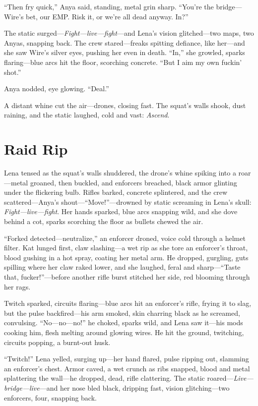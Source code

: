 \documentclass[12pt]{book}
\begin{document}
``Then fry quick,'' Anya said, standing, metal grin sharp. ``You’re the bridge---Wire’s bet, our EMP. Risk it, or we’re all dead anyway. In?''

The static surged---\emph{Fight---live---fight}---and Lena’s vision glitched---two maps, two Anyas, snapping back. The crew stared---freaks spitting defiance, like her---and she saw Wire’s silver eyes, pushing her even in death. ``In,'' she growled, sparks flaring---blue arcs hit the floor, scorching concrete. ``But I aim my own fuckin’ shot.''

Anya nodded, eye glowing. ``Deal.''

A distant whine cut the air---drones, closing fast. The squat’s walls shook, dust raining, and the static laughed, cold and vast: \emph{Ascend}.

\section{Raid Rip}

Lena tensed as the squat’s walls shuddered, the drone’s whine spiking into a roar---metal groaned, then buckled, and enforcers breached, black armor glinting under the flickering bulb. Rifles barked, concrete splintered, and the crew scattered---Anya’s shout---``Move!''---drowned by static screaming in Lena’s skull: \emph{Fight---live---fight}. Her hands sparked, blue arcs snapping wild, and she dove behind a cot, sparks scorching the floor as bullets chewed the air.

``Forked detected---neutralize,'' an enforcer droned, voice cold through a helmet filter. Kat lunged first, claw slashing---a wet rip as she tore an enforcer’s throat, blood gushing in a hot spray, coating her metal arm. He dropped, gurgling, guts spilling where her claw raked lower, and she laughed, feral and sharp---``Taste that, fucker!''---before another rifle burst stitched her side, red blooming through her rags.

Twitch sparked, circuits flaring---blue arcs hit an enforcer’s rifle, frying it to slag, but the pulse backfired---his arm smoked, skin charring black as he screamed, convulsing. ``No---no---no!'' he choked, sparks wild, and Lena saw it---his mods cooking him, flesh melting around glowing wires. He hit the ground, twitching, circuits popping, a burnt-out husk.

``Twitch!'' Lena yelled, surging up---her hand flared, pulse ripping out, slamming an enforcer’s chest. Armor caved, a wet crunch as ribs snapped, blood and metal splattering the wall---he dropped, dead, rifle clattering. The static roared---\emph{Live---bridge---live}---and her nose bled black, dripping fast, vision glitching---two enforcers, four, snapping back.
\end{document}
